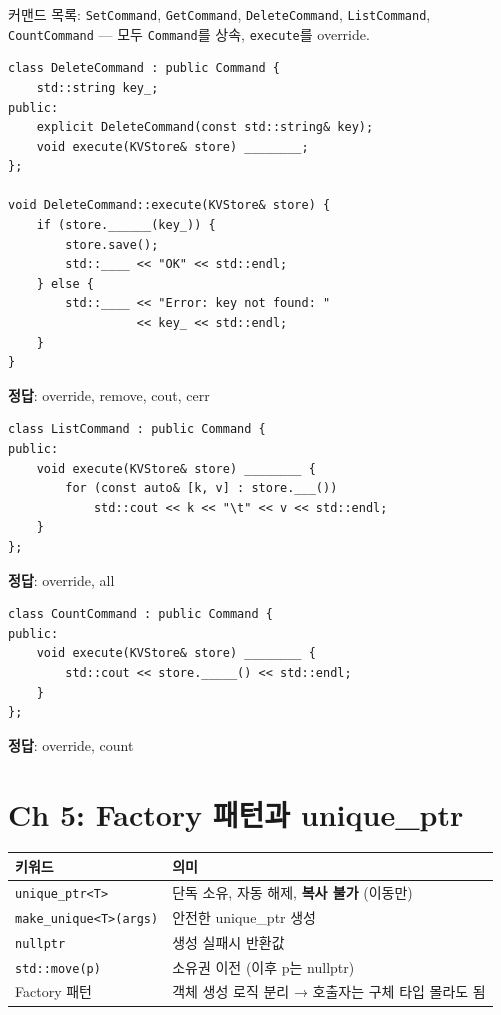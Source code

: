 \documentclass[11pt,a4paper]{article}
\newcommand{\code}[1]{\texttt{#1}}
\begin{document}
커맨드 목록: \code{SetCommand}, \code{GetCommand}, \code{DeleteCommand}, \code{ListCommand}, \code{CountCommand} --- 모두 \code{Command}를 상속, \code{execute}를 override.

\begin{quizbox}[title={Q4-1: DeleteCommand}]
\begin{lstlisting}[style=cpp,numbers=none]
class DeleteCommand : public Command {
    std::string key_;
public:
    explicit DeleteCommand(const std::string& key);
    void execute(KVStore& store) ________;
};

void DeleteCommand::execute(KVStore& store) {
    if (store.______(key_)) {
        store.save();
        std::____ << "OK" << std::endl;
    } else {
        std::____ << "Error: key not found: "
                  << key_ << std::endl;
    }
}
\end{lstlisting}
\textbf{정답}: override, remove, cout, cerr
\end{quizbox}

\begin{quizbox}[title={Q4-2: ListCommand}]
\begin{lstlisting}[style=cpp,numbers=none]
class ListCommand : public Command {
public:
    void execute(KVStore& store) ________ {
        for (const auto& [k, v] : store.___())
            std::cout << k << "\t" << v << std::endl;
    }
};
\end{lstlisting}
\textbf{정답}: override, all
\end{quizbox}

\begin{quizbox}[title={Q4-3: CountCommand}]
\begin{lstlisting}[style=cpp,numbers=none]
class CountCommand : public Command {
public:
    void execute(KVStore& store) ________ {
        std::cout << store._____() << std::endl;
    }
};
\end{lstlisting}
\textbf{정답}: override, count
\end{quizbox}


\section{Ch 5: Factory 패턴과 unique\_ptr}

\begin{tabularx}{\textwidth}{@{}lX@{}}
\toprule
\textbf{키워드} & \textbf{의미} \\
\midrule
\code{unique\_ptr<T>} & 단독 소유, 자동 해제, \textbf{복사 불가} (이동만) \\
\code{make\_unique<T>(args)} & 안전한 unique\_ptr 생성 \\
\code{nullptr} & 생성 실패시 반환값 \\
\code{std::move(p)} & 소유권 이전 (이후 p는 nullptr) \\
Factory 패턴 & 객체 생성 로직 분리 → 호출자는 구체 타입 몰라도 됨 \\
\bottomrule
\end{tabularx}
\end{document}
